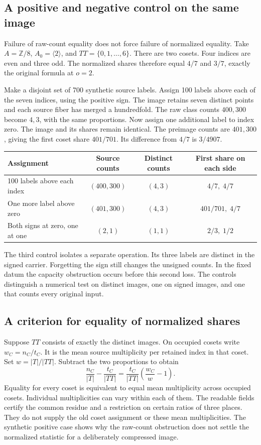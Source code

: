 \documentclass[12pt,letterpaper]{article}
\begin{document}
\subsection{A positive and negative control on the same image}
Failure of raw-count equality does not force failure of normalized equality. Take $A=\mathbb Z/8$, $A_0=\langle2\rangle$, and $TT=\{0,1,\ldots,6\}$. There are two cosets. Four indices are even and three odd. The normalized shares therefore equal $4/7$ and $3/7$, exactly the original formula at $o=2$.

Make a disjoint set of 700 synthetic source labels. Assign 100 labels above each of the seven indices, using the positive sign. The image retains seven distinct points and each source fiber has merged a hundredfold. The raw class counts $400,300$ become $4,3$, with the same proportions. Now assign one additional label to index zero. The image and its shares remain identical. The preimage counts are $401,300$, giving the first coset share $401/701$. Its difference from $4/7$ is $3/4907$.
\begin{center}\small
\begin{tabular}{@{}lccc@{}}\toprule
Assignment & Source counts & Distinct counts & First share on each side\\\midrule
100 labels above each index & $(400,300)$ & $(4,3)$ & $4/7,\;4/7$\\
One more label above zero & $(401,300)$ & $(4,3)$ & $401/701,\;4/7$\\
Both signs at zero, one at one & $(2,1)$ & $(1,1)$ & $2/3,\;1/2$\\\bottomrule
\end{tabular}
\end{center}
The third control isolates a separate operation. Its three labels are distinct in the signed carrier. Forgetting the sign still changes the unsigned counts. In the fixed datum the capacity obstruction occurs before this second loss. The controls distinguish a numerical test on distinct images, one on signed images, and one that counts every original input.

\subsection{A criterion for equality of normalized shares}
Suppose $TT$ consists of exactly the distinct images. On occupied cosets write $w_C=n_C/t_C$. It is the mean source multiplicity per retained index in that coset. Set $w=|T|/|TT|$. Subtract the two proportions to obtain
\[
      \frac{n_C}{|T|}-\frac{t_C}{|TT|}
          = \frac{t_C}{|TT|}\left(\frac{w_C}{w}-1\right).
\]
Equality for every coset is equivalent to equal mean multiplicity across occupied cosets. Individual multiplicities can vary within each of them. The readable fields certify the common residue and a restriction on certain ratios of three places. They do not supply the old coset assignment or these mean multiplicities. The synthetic positive case shows why the raw-count obstruction does not settle the normalized statistic for a deliberately compressed image.
\end{document}
